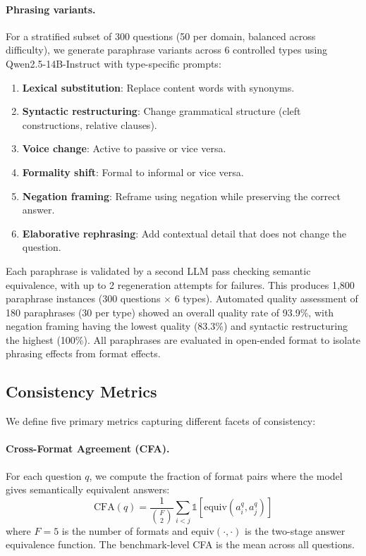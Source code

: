 \documentclass{article}
\newcommand{\cfa}{\text{CFA}}
\begin{document}
\paragraph{Phrasing variants.}
For a stratified subset of 300 questions (50 per domain, balanced across difficulty), we generate paraphrase variants across 6 controlled types using Qwen2.5-14B-Instruct with type-specific prompts:
\begin{enumerate}
    \item \textbf{Lexical substitution}: Replace content words with synonyms.
    \item \textbf{Syntactic restructuring}: Change grammatical structure (cleft constructions, relative clauses).
    \item \textbf{Voice change}: Active to passive or vice versa.
    \item \textbf{Formality shift}: Formal to informal or vice versa.
    \item \textbf{Negation framing}: Reframe using negation while preserving the correct answer.
    \item \textbf{Elaborative rephrasing}: Add contextual detail that does not change the question.
\end{enumerate}
Each paraphrase is validated by a second LLM pass checking semantic equivalence, with up to 2 regeneration attempts for failures. This produces 1,800 paraphrase instances (300 questions $\times$ 6 types). Automated quality assessment of 180 paraphrases (30 per type) showed an overall quality rate of 93.9\%, with negation framing having the lowest quality (83.3\%) and syntactic restructuring the highest (100\%). All paraphrases are evaluated in open-ended format to isolate phrasing effects from format effects.

\subsection{Consistency Metrics}

We define five primary metrics capturing different facets of consistency:

\paragraph{Cross-Format Agreement (CFA).} For each question $q$, we compute the fraction of format pairs where the model gives semantically equivalent answers:
\begin{equation}
    \cfa(q) = \frac{1}{\binom{F}{2}} \sum_{i < j} \mathbb{1}[\text{equiv}(a_i^q, a_j^q)]
\end{equation}
where $F=5$ is the number of formats and $\text{equiv}(\cdot, \cdot)$ is the two-stage answer equivalence function. The benchmark-level CFA is the mean across all questions.
\end{document}
